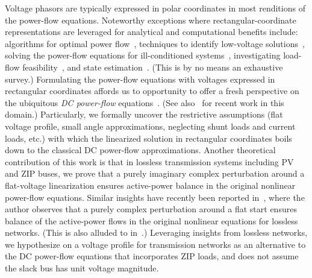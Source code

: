 \documentclass[10 pt, conference]{ieeeconf}
\begin{document}
Voltage phasors are typically expressed in polar coordinates in most renditions of the power-flow equations. Noteworthy exceptions where rectangular-coordinate representations are leveraged for analytical and computational benefits include: algorithms for optimal power flow~\cite{Torres96optimalpower,Costa-1999,Zhang-2005}, techniques to identify low-voltage solutions~\cite{Overbye-1996}, solving the power-flow equations for ill-conditioned systems~\cite{Iwamoto-1981}, investigating load-flow feasibility~\cite{Makarov-2000}, and state estimation~\cite{Rao-1983,Keyhani-1985}. (This is by no means an exhaustive survey.) Formulating the power-flow equations with voltages expressed in rectangular coordinates affords us to opportunity to offer a fresh perspective on the ubiquitous \emph{DC power-flow} equations~\cite{Wood:1996}. (See also~\cite{Dorfler-DCPowerFlow-2013,Stott-2009} for recent work in this domain.) Particularly, we formally uncover the restrictive assumptions (flat voltage profile, small angle approximations, neglecting shunt loads and current loads, etc.) with which the linearized solution in rectangular coordinates boils down to the classical DC power-flow approximations. Another theoretical contribution of this work is that in lossless transmission systems including $\mathrm{PV}$ and $\mathrm{ZIP}$ buses, we prove that a purely imaginary complex perturbation around a flat-voltage linearization ensures active-power balance in the original nonlinear power-flow equations. Similar insights have recently been reported in~\cite{Ross-2013}, where the author observes that a purely complex perturbation around a flat start ensures balance of the active-power flows in the original nonlinear equations for lossless networks. (This is also alluded to in~\cite{Baosen-2013}.) Leveraging insights from lossless networks, we hypothesize on a voltage profile for transmission networks as an alternative to the DC power-flow equations that incorporates $\mathrm{ZIP}$ loads, and does not assume the slack bus has unit voltage magnitude.
\end{document}
